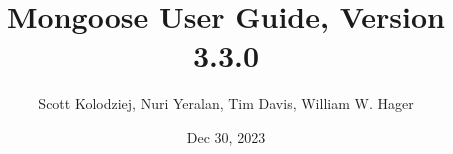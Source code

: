 \title{Mongoose User Guide, Version 3.3.0}
\author{Scott Kolodziej, Nuri Yeralan, Tim Davis, William W. Hager}
\date{Dec 30, 2023}
